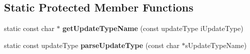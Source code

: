 \subsection*{\-Static \-Protected \-Member \-Functions}
\begin{DoxyCompactItemize}
\item 
\hypertarget{classgeneral__server_1_1TXml_abcc759200e44e0fdd7f2116bb60230a7}{static const char $\ast$ {\bfseries get\-Update\-Type\-Name} (const update\-Type i\-Update\-Type)}\label{classgeneral__server_1_1TXml_abcc759200e44e0fdd7f2116bb60230a7}

\item 
\hypertarget{classgeneral__server_1_1TXml_aa42b3fbc7ca581d4128203420b43b935}{static const update\-Type {\bfseries parse\-Update\-Type} (const char $\ast$s\-Update\-Type\-Name)}\label{classgeneral__server_1_1TXml_aa42b3fbc7ca581d4128203420b43b935}

\end{DoxyCompactItemize}
